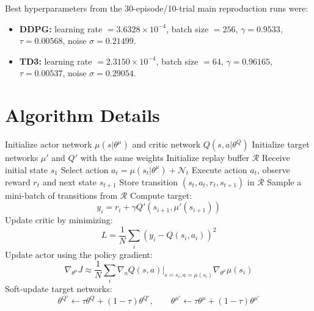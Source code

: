 \documentclass{article}
\begin{document}
Best hyperparameters from the 30-episode/10-trial main reproduction runs were:
\begin{itemize}
    \item \textbf{DDPG:} learning rate $= 3.6328 \times 10^{-4}$, batch size $=256$, $\gamma = 0.9533$, $\tau = 0.00568$, noise $\sigma = 0.21499$.
    \item \textbf{TD3:} learning rate $= 2.3150 \times 10^{-4}$, batch size $=64$, $\gamma = 0.96165$, $\tau = 0.00537$, noise $\sigma = 0.29054$.
\end{itemize}

\FloatBarrier

\section{Algorithm Details}
\label{app:algorithms}
\FloatBarrier

\begin{algorithm}[H]
\caption{DDPG}
\label{alg:ddpg}
\begin{algorithmic}[1]
\State Initialize actor network $\mu(s|\theta^\mu)$ and critic network $Q(s,a|\theta^Q)$
\State Initialize target networks $\mu'$ and $Q'$ with the same weights
\State Initialize replay buffer $\mathcal{R}$
    \State Receive initial state $s_1$
        \State Select action $a_t = \mu(s_t|\theta^\mu) + \mathcal{N}_t$
        \State Execute action $a_t$, observe reward $r_t$ and next state $s_{t+1}$
        \State Store transition $(s_t,a_t,r_t,s_{t+1})$ in $\mathcal{R}$
        \State Sample a mini-batch of transitions from $\mathcal{R}$
        \State Compute target:
        \[
        y_i = r_i + \gamma Q'(s_{i+1}, \mu'(s_{i+1}))
        \]
        \State Update critic by minimizing:
        \[
        L = \frac{1}{N}\sum_i \left(y_i - Q(s_i,a_i)\right)^2
        \]
        \State Update actor using the policy gradient:
        \[
        \nabla_{\theta^\mu}J \approx
        \frac{1}{N}\sum_i
        \nabla_a Q(s,a)|_{s=s_i,a=\mu(s_i)}
        \nabla_{\theta^\mu}\mu(s_i)
        \]
        \State Soft-update target networks:
        \[
        \theta^{Q'} \leftarrow \tau \theta^Q + (1-\tau)\theta^{Q'},
        \qquad
        \theta^{\mu'} \leftarrow \tau \theta^\mu + (1-\tau)\theta^{\mu'}
        \]
    \EndFor
\EndFor
\end{algorithmic}
\end{algorithm}
\end{document}
